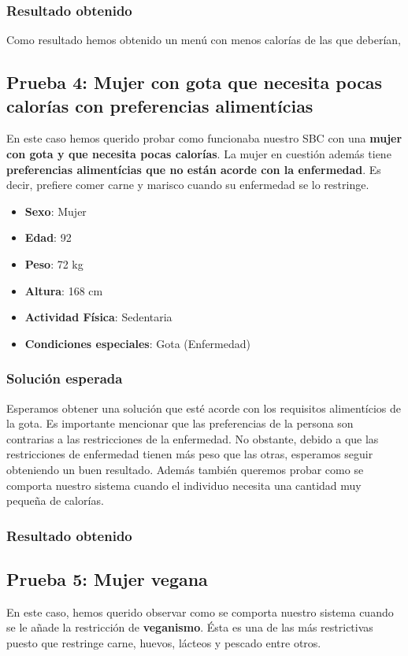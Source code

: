 \documentclass[11]{article}
\begin{document}
\subsubsection{Resultado obtenido}

Como resultado hemos obtenido un menú con menos calorías de las que deberían, 

\subsection{Prueba 4: Mujer con gota que necesita pocas calorías con preferencias alimentícias}

En este caso hemos querido probar como funcionaba nuestro SBC con una \textbf{mujer con gota y que necesita pocas calorías}. La mujer en cuestión además tiene \textbf{preferencias alimentícias que no están acorde con la enfermedad}. Es decir, prefiere comer carne y marisco cuando su enfermedad se lo restringe. 

\begin{itemize}
\item \textbf{Sexo}: Mujer
\item \textbf{Edad}: 92
\item \textbf{Peso}: 72 kg 
\item \textbf{Altura}: 168 cm
\item \textbf{Actividad Física}: Sedentaria
\item \textbf{Condiciones especiales}: Gota (Enfermedad)
\end{itemize}

\subsubsection{Solución esperada}
Esperamos obtener una solución que esté acorde con los requisitos alimentícios de la gota. Es importante mencionar que las preferencias de la persona son contrarias a las restricciones de la enfermedad. No obstante, debido a que las restricciones de enfermedad tienen más peso que las otras, esperamos seguir obteniendo un buen resultado. Además también queremos probar como se comporta nuestro sistema cuando el individuo necesita una cantidad muy pequeña de calorías. 

\subsubsection{Resultado obtenido}


\subsection{Prueba 5: Mujer vegana}
En este caso, hemos querido observar como se comporta nuestro sistema cuando se le añade la restricción de \textbf{veganismo}. Ésta es una de las más restrictivas puesto que restringe carne, huevos, lácteos y pescado entre otros. 
\end{document}
